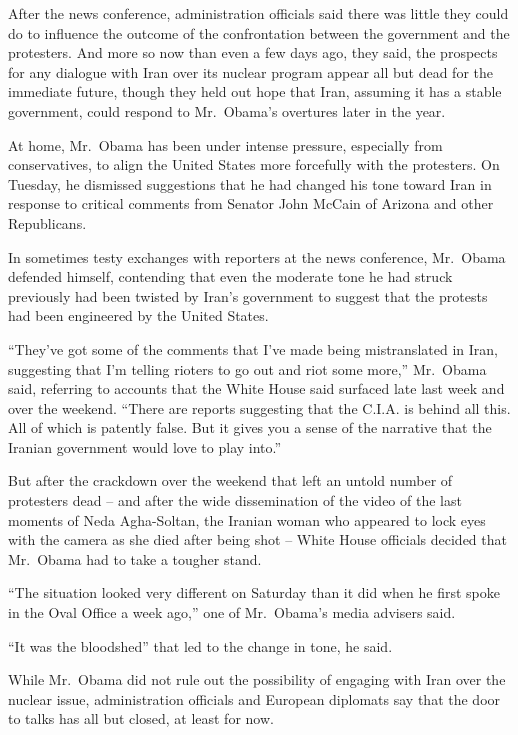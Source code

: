 ﻿\documentclass[12pt,a4paper,onecolumn]{article}
\begin{document}
After the news conference, administration officials said there was little they could do to influence
the outcome of the confrontation between the government and the protesters. And more so now than
even a few days ago, they said, the prospects for any dialogue with Iran over its nuclear program
appear all but dead for the immediate future, though they held out hope that Iran, assuming it has a
stable government, could respond to Mr.~Obama's overtures later in the year.

At home, Mr.~Obama has been under intense pressure, especially from conservatives, to align the
United States more forcefully with the protesters. On Tuesday, he dismissed suggestions that he had
changed his tone toward Iran in response to critical comments from Senator John McCain of Arizona
and other Republicans.

In sometimes testy exchanges with reporters at the news conference, Mr.~Obama defended himself,
contending that even the moderate tone he had struck previously had been twisted by Iran's
government to suggest that the protests had been engineered by the United States.

``They've got some of the comments that I've made being mistranslated in Iran, suggesting that I'm
telling rioters to go out and riot some more,'' Mr.~Obama said, referring to accounts that the White
House said surfaced late last week and over the weekend. ``There are reports suggesting that the
C.I.A. is behind all this. All of which is patently false. But it gives you a sense of the narrative
that the Iranian government would love to play into.''

But after the crackdown over the weekend that left an untold number of protesters dead -- and after
the wide dissemination of the video of the last moments of Neda Agha-Soltan, the Iranian woman who
appeared to lock eyes with the camera as she died after being shot -- White House officials decided
that Mr.~Obama had to take a tougher stand.

``The situation looked very different on Saturday than it did when he first spoke in the Oval Office
a week ago,'' one of Mr.~Obama's media advisers said.

``It was the bloodshed'' that led to the change in tone, he said.

While Mr.~Obama did not rule out the possibility of engaging with Iran over the nuclear issue,
administration officials and European diplomats say that the door to talks has all but closed, at
least for now.
\end{document}
